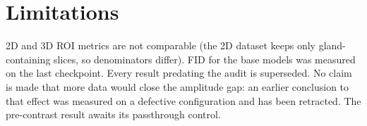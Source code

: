 \documentclass[11pt]{article}
\newcommand{\1}{\mathbb{1}}
\begin{document}
\section{Limitations}

2D and 3D ROI metrics are not comparable (the 2D dataset keeps only gland-containing slices,
so denominators differ). FID for the base models was measured on the last checkpoint. Every
result predating the audit is superseded. No claim is made that more data would close the
amplitude gap: an earlier conclusion to that effect was measured on a defective configuration
and has been retracted. The pre-contrast result awaits its passthrough control.
\end{document}
